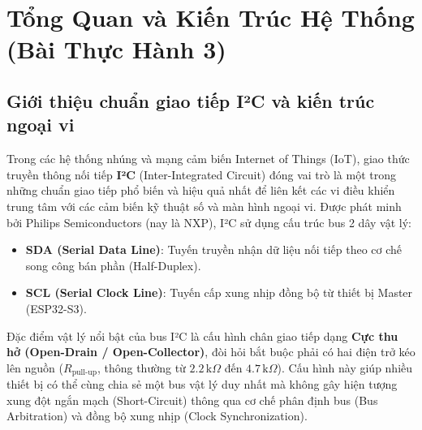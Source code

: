 \setcounter{table}{0}
\section{Tổng Quan và Kiến Trúc Hệ Thống (Bài Thực Hành 3)}

\subsection{Giới thiệu chuẩn giao tiếp I²C và kiến trúc ngoại vi}
Trong các hệ thống nhúng và mạng cảm biến Internet of Things (IoT), giao thức truyền thông nối tiếp \textbf{I²C} (Inter-Integrated Circuit) đóng vai trò là một trong những chuẩn giao tiếp phổ biến và hiệu quả nhất để liên kết các vi điều khiển trung tâm với các cảm biến kỹ thuật số và màn hình ngoại vi. Được phát minh bởi Philips Semiconductors (nay là NXP), I²C sử dụng cấu trúc bus 2 dây vật lý:
\begin{itemize}[leftmargin=*]
    \item \textbf{SDA (Serial Data Line)}: Tuyến truyền nhận dữ liệu nối tiếp theo cơ chế song công bán phần (Half-Duplex).
    \item \textbf{SCL (Serial Clock Line)}: Tuyến cấp xung nhịp đồng bộ từ thiết bị Master (ESP32-S3).
\end{itemize}

Đặc điểm vật lý nổi bật của bus I²C là cấu hình chân giao tiếp dạng \textbf{Cực thu hở (Open-Drain / Open-Collector)}, đòi hỏi bắt buộc phải có hai điện trở kéo lên nguồn ($R_{\text{pull-up}}$, thông thường từ $2.2\,\text{k}\Omega$ đến $4.7\,\text{k}\Omega$). Cấu hình này giúp nhiều thiết bị có thể cùng chia sẻ một bus vật lý duy nhất mà không gây hiện tượng xung đột ngắn mạch (Short-Circuit) thông qua cơ chế phân định bus (Bus Arbitration) và đồng bộ xung nhịp (Clock Synchronization).

